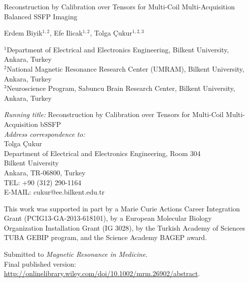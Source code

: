 \documentclass[11pt, onecolumn]{article}
\begin{document}


\begin{titlepage}

\begin{center}
	\begin{Large}
		\begin{bf}
Reconstruction by Calibration over Tensors for Multi-Coil Multi-Acquisition Balanced SSFP Imaging
		\end{bf}
	\end{Large}
\end{center}
\bigskip
\begin{center}
Erdem Biyik$^{1,2}$, Efe Ilicak$^{1,2}$, Tolga \c{C}ukur$^{1,2,3}$
\end{center}
\vspace*{0.1in}
\noindent
$^1$Department of Electrical and Electronics Engineering, Bilkent University, Ankara, Turkey\\
$^2$National Magnetic Resonance Research Center (UMRAM), Bilkent University, Ankara, Turkey\\
$^3$Neuroscience Program, Sabuncu Brain Research Center, Bilkent University, Ankara, Turkey

\vspace*{0.1in}
\noindent
{\em Running title:} Reconstruction by Calibration over Tensors for Multi-Coil Multi-Acquisition bSSFP\\
                                                           
\noindent
{\em Address correspondence to:} \\
	Tolga \c{C}ukur \\
	Department of Electrical and Electronics Engineering, Room 304 \\
	Bilkent University \\
	Ankara, TR-06800, Turkey \\
	TEL: +90 (312) 290-1164 \\
    E-MAIL: cukur@ee.bilkent.edu.tr

\vspace*{0.2in}

\noindent
This work was supported in part by a Marie Curie Actions Career Integration Grant (PCIG13-GA-2013-618101), by a European Molecular Biology Organization Installation Grant (IG 3028), by the Turkish Academy of Sciences TUBA GEBIP program, and the Science Academy BAGEP award.


\vspace*{0.2in}

\noindent
Submitted to {\it Magnetic Resonance in Medicine}.\\
Final published version: \url{http://onlinelibrary.wiley.com/doi/10.1002/mrm.26902/abstract}.\\
\end{titlepage}
\end{document}
